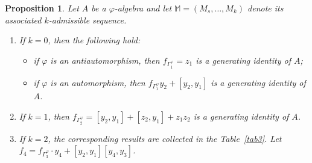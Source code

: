 \documentclass{amsart}
\newtheorem{prop}[thm]{Proposition}
\theoremstyle{definition}
\theoremstyle{remark}
\numberwithin{equation}{section}
\def \Ga{\Gamma}
\def \vp{\varphi}
\def \M{\mathbb{M}}
\begin{document}
\begin{prop} \label{prop3.6}
	Let $A$ be a $\vp$-algebra and let $\M=(M_s,\dots,M_k)$ denote its associated $k$-admissible sequence.
	\begin{enumerate}
		\item[(1)]
	If $k=0$, then the following hold:
		\begin{itemize}
			\item if $\vp$ is an antiautomorphism, then $f_{\Ga_1^\vp} = z_1$ is a generating identity of $A$;
			\item if $\vp$ is an automorphism, then $f_{\Ga_1^\vp}y_2 + [y_2, y_1]$ is a generating identity of $A$.
		\end{itemize}
		\item[(2)]
		If $k = 1$, then $f_{\Ga_2^\vp} = [y_2, y_1] + [z_2, y_1] + z_1z_2$ is a generating identity of $A$.
		\item[(3)]
		If $k = 2$, the corresponding results are collected in the Table~\ref{tab3}. Let $f_4 = f_{\Ga_3^\vp}\cdot y_4 + [y_2,y_1][y_4,y_3]$.
	\end{enumerate}
\end{prop}
	
			
\end{document}
